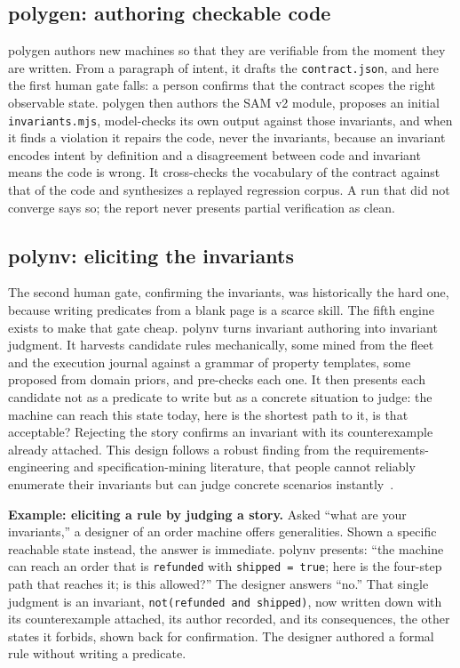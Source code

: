 \documentclass[11pt]{article}
\newenvironment{example}[1][Example]%
  {\par\smallskip\begin{leftbar}\noindent\textbf{#1.}\enspace}%
  {\end{leftbar}\par\smallskip}
\newcommand{\tool}[1]{\textsf{#1}}
\newcommand{\code}[1]{\texttt{#1}}
\begin{document}
\subsection{\tool{polygen}: authoring checkable code}

\tool{polygen} authors new machines so that they are verifiable from the moment
they are written. From a paragraph of intent, it drafts the
\code{contract.json}, and here the first human gate falls: a person confirms
that the contract scopes the right observable state. \tool{polygen} then
authors the SAM v2 module, proposes an initial \code{invariants.mjs},
model-checks its own output against those invariants, and when it finds a
violation it repairs the code, never the invariants, because an invariant
encodes intent by definition and a disagreement between code and invariant
means the code is wrong. It cross-checks the vocabulary of the contract against
that of the code and synthesizes a replayed regression corpus. A run that did
not converge says so; the report never presents partial verification as clean.

\subsection{\tool{polynv}: eliciting the invariants}\label{sub:polynv}

The second human gate, confirming the invariants, was historically the hard
one, because writing predicates from a blank page is a scarce skill. The fifth
engine exists to make that gate cheap. \tool{polynv} turns invariant authoring
into invariant judgment. It harvests candidate rules mechanically, some mined
from the fleet and the execution journal against a grammar of property
templates, some proposed from domain priors, and pre-checks each one. It then
presents each candidate not as a predicate to write but as a concrete situation
to judge: the machine can reach this state today, here is the shortest path to
it, is that acceptable? Rejecting the story confirms an invariant with its
counterexample already attached. This design follows a robust finding from the
requirements-engineering and specification-mining literature, that people
cannot reliably enumerate their invariants but can judge concrete scenarios
instantly~\cite{daikon, vanlamsweerde}.

\begin{example}[Example: eliciting a rule by judging a story]
Asked ``what are your invariants,'' a designer of an order machine offers
generalities. Shown a specific reachable state instead, the answer is immediate.
\tool{polynv} presents: ``the machine can reach an order that is
\code{refunded} with \code{shipped = true}; here is the four-step path that
reaches it; is this allowed?'' The designer answers ``no.'' That single judgment
is an invariant, \code{not(refunded and shipped)}, now written down with its
counterexample attached, its author recorded, and its consequences, the other
states it forbids, shown back for confirmation. The designer authored a formal
rule without writing a predicate.
\end{example}
\end{document}
